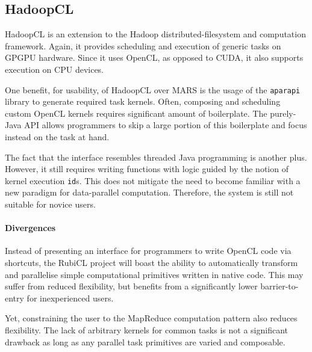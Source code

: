 \subsection{HadoopCL}
HadoopCL\cite{hadoopcl} is an extension to the Hadoop\cite{hadoop} distributed-filesystem and computation framework. Again, it provides scheduling and execution of generic tasks on  \ac{GPGPU} hardware. Since it uses \ac{OpenCL}, as opposed to \ac{CUDA}, it also supports execution on \ac{CPU} devices.

One benefit, for usability, of HadoopCL over MARS is the usage of the \verb|aparapi| library\cite{aparapi} to generate required task kernels. Often,  composing and scheduling custom \ac{OpenCL} kernels requires significant amount of boilerplate. The purely-Java \ac{API} allows programmers to skip a large portion of this boilerplate and focus instead on the task at hand.

The fact that the interface resembles threaded Java programming is another plus. However, it still requires writing functions with logic guided by the notion of kernel execution \verb|id|s. This does not mitigate the need to become familiar with a new paradigm for data-parallel computation. Therefore, the system is still not suitable for novice users.

\paragraph*{Divergences}
Instead of presenting an interface for programmers to write \ac{OpenCL} code via shortcuts, the RubiCL project will boast the ability to automatically transform and parallelise simple computational primitives written in native code. This may suffer from reduced flexibility, but benefits from a significantly lower barrier-to-entry for inexperienced users.

Yet, constraining the user to the MapReduce computation pattern also reduces flexibility. The lack of arbitrary kernels for common tasks is not a significant drawback as long as any parallel task primitives are varied and composable.


